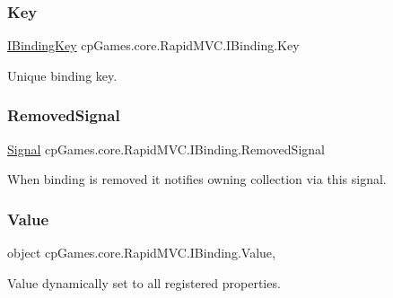 \subsubsection{\texorpdfstring{Key}{Key}}
{\footnotesize\ttfamily \mbox{\hyperlink{interfacecp_games_1_1core_1_1_rapid_m_v_c_1_1_i_binding_key}{I\+Binding\+Key}} cp\+Games.\+core.\+Rapid\+M\+V\+C.\+I\+Binding.\+Key\hspace{0.3cm}{\ttfamily [get]}}



Unique binding key. 

\mbox{\label{interfacecp_games_1_1core_1_1_rapid_m_v_c_1_1_i_binding_afc250797ed507d05b9b611f4d63cd345}} 
\subsubsection{\texorpdfstring{RemovedSignal}{RemovedSignal}}
{\footnotesize\ttfamily \mbox{\hyperlink{classcp_games_1_1core_1_1_rapid_m_v_c_1_1_signal}{Signal}} cp\+Games.\+core.\+Rapid\+M\+V\+C.\+I\+Binding.\+Removed\+Signal\hspace{0.3cm}{\ttfamily [get]}}



When binding is removed it notifies owning collection via this signal. 

\mbox{\label{interfacecp_games_1_1core_1_1_rapid_m_v_c_1_1_i_binding_a7ec4a6dc07e378d9ffd775b4d6b387f7}} 
\subsubsection{\texorpdfstring{Value}{Value}}
{\footnotesize\ttfamily object cp\+Games.\+core.\+Rapid\+M\+V\+C.\+I\+Binding.\+Value\hspace{0.3cm}{\ttfamily [get]}, {\ttfamily [set]}}



Value dynamically set to all registered properties. 

